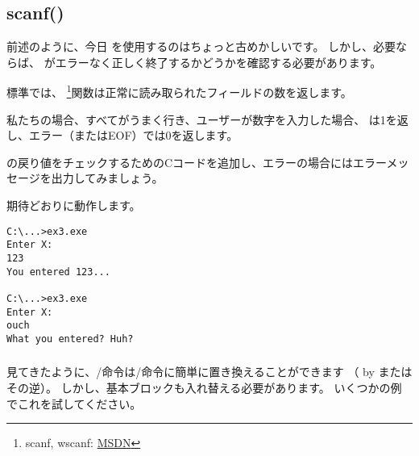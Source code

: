 \subsection{scanf()}

前述のように、今日 \scanf を使用するのはちょっと古めかしいです。 
しかし、必要ならば、 \scanf がエラーなく正しく終了するかどうかを確認する必要があります。



標準では、 \scanf \footnote{scanf, wscanf: \href{http://go.yurichev.com/17255}{MSDN}}関数は正常に読み取られたフィールドの数を返します。

私たちの場合、すべてがうまく行き、ユーザーが数字を入力した場合、 \scanf は1を返し、エラー（または\ac{EOF}）では0を返します。

\scanf の戻り値をチェックするためのCコードを追加し、エラーの場合にはエラーメッセージを出力してみましょう。

期待どおりに動作します。

\begin{lstlisting}
C:\...>ex3.exe
Enter X:
123
You entered 123...

C:\...>ex3.exe
Enter X:
ouch
What you entered? Huh?
\end{lstlisting}






\subsubsection{\Exercise}

見てきたように、/命令は/命令に簡単に置き換えることができます
（ by またはその逆）。 
しかし、基本ブロックも入れ替える必要があります。 
いくつかの例でこれを試してください。
